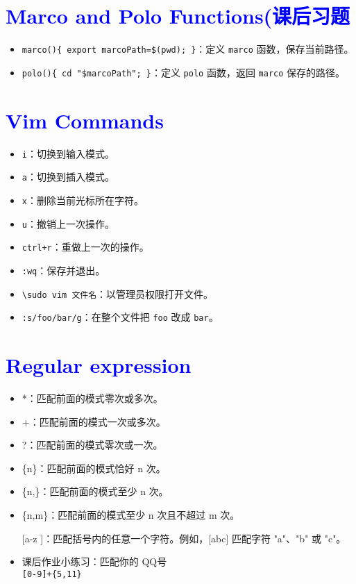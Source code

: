 \documentclass{article}
\begin{document}
\section{\textcolor{blue}{Marco and Polo Functions(课后习题}}
\begin{itemize}
    \item \texttt{marco()\{ export marcoPath=\$(pwd); \}}：定义 \texttt{marco} 函数，保存当前路径。
    \item \texttt{polo()\{ cd "\$marcoPath"; \}}：定义 \texttt{polo} 函数，返回 \texttt{marco} 保存的路径。
\end{itemize}

\section{\textcolor{blue}{Vim Commands}}
\begin{itemize}
    \item \texttt{i}：切换到输入模式。
    \item \texttt{a}：切换到插入模式。
    \item \texttt{x}：删除当前光标所在字符。
    \item \texttt{u}：撤销上一次操作。
    \item \texttt{ctrl+r}：重做上一次的操作。
    \item \texttt{:wq}：保存并退出。
    \item \texttt{\textbackslash sudo vim 文件名}：以管理员权限打开文件。
    \item \texttt{:s/foo/bar/g}：在整个文件把 \texttt{foo} 改成 \texttt{bar}。
\end{itemize}
\section{\textcolor{blue}{Regular expression}}
\begin{itemize}
  \item *：匹配前面的模式零次或多次。
  \item +：匹配前面的模式一次或多次。
  \item?：匹配前面的模式零次或一次。
  \item \{n\}：匹配前面的模式恰好 n 次。
  \item \{n,\}：匹配前面的模式至少 n 次。
  \item \{n,m\}：匹配前面的模式至少 n 次且不超过 m 次。
  \item [[a-z]]：匹配括号内的任意一个字符。例如，[abc] 匹配字符 "a"、"b" 或 "c"。 
  \item 课后作业小练习：匹配你的 QQ号 \\ \texttt{[0-9]+\{5,11\}}
\end{itemize}
\end{document}
